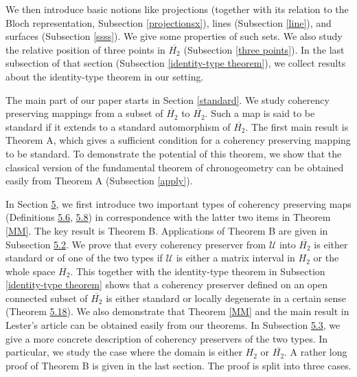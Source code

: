 \documentclass[10pt,a4paper]{amsart}
\newcommand\oH{{\overline{H_2}}}
\theoremstyle{definition}
\theoremstyle{remark}
\numberwithin{subsection}{section}
\numberwithin{equation}{section}
\begin{document}
We then introduce basic notions like projections (together with its relation to the Bloch representation, Subsection \ref{projectionsx}), lines (Subsection \ref{line}), and surfaces (Subsection \ref{ssss}). We give some properties of such sets. We also study the relative position of three points in $\oH$ (Subsection \ref{three points}).
In the last subsection of that section (Subsection \ref{identity-type theorem}), we collect results about the identity-type theorem in our setting.

The main part of our paper starts in Section \ref{standard}.
We study coherency preserving mappings from a subset of $\oH$ to $\oH$. 
Such a map is said to be standard if it extends to a standard automorphism of $\oH$.
The first main result is Theorem A, which gives a sufficient condition for a coherency preserving mapping to be standard. 
To demonstrate the potential of this theorem, we show that the classical version of the fundamental theorem of chronogeometry can be obtained easily from Theorem A (Subsection \ref{apply}).

In Section \href{https://arxiv.org/abs/2406.18874v2}{5}, we first introduce two important types of coherency preserving maps (Definitions \href{https://arxiv.org/abs/2406.18874v2}{5.6}, \href{https://arxiv.org/abs/2406.18874v2}{5.8}) in correspondence with the latter two items in Theorem \ref{MM}. 
The key result is Theorem B.
Applications of Theorem B are given in Subsection \href{https://arxiv.org/abs/2406.18874v2}{5.2}.
We prove that every coherency preserver from $\mathcal{U}$ into $\oH$ is either standard or of one of the two types if $\mathcal{U}$ is either a matrix interval in $H_2$ or the whole space $\oH$. 
This together with the identity-type theorem in Subsection \ref{identity-type theorem} shows that a coherency preserver defined on an open connected subset of $\oH$ is either standard or locally degenerate in a certain sense (Theorem \href{https://arxiv.org/abs/2406.18874v2}{5.18}).
We also demonstrate that Theorem \ref{MM} and the main result in Lester's article \cite{Les} can be obtained easily from our theorems.
In Subsection \href{https://arxiv.org/abs/2406.18874v2}{5.3}, we give a more concrete description of coherency preservers of the two types. In particular, we study the case where the domain is either $H_2$ or $\oH$.
A rather long proof of Theorem B is given in the last section. 
The proof is split into three cases.
\end{document}
